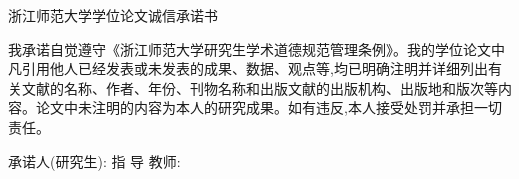 浙江师范大学学位论文诚信承诺书

我承诺自觉遵守《浙江师范大学研究生学术道德规范管理条例》。我的学位论文中凡引用他人已经发表或未发表的成果、数据、观点等,均已明确注明并详细列出有关文献的名称、作者、年份、刊物名称和出版文献的出版机构、出版地和版次等内容。论文中未注明的内容为本人的研究成果。如有违反,本人接受处罚并承担一切责任。  

承诺人(研究生):
指 导 教师: